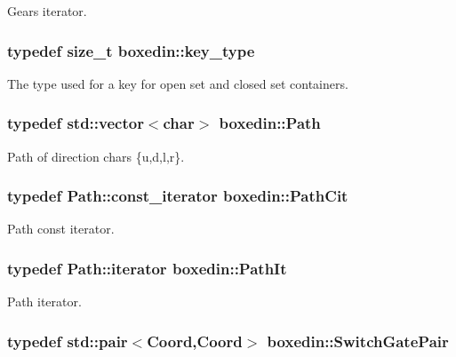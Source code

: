 Gears iterator. \hypertarget{namespaceboxedin_ac4dc3ff36b9cef0b4c5cc1a96bfc0abd}{
\subsubsection[{key\+\_\+type}]{\setlength{\rightskip}{0pt plus 5cm}typedef size\+\_\+t {\bf boxedin\+::key\+\_\+type}}}\label{namespaceboxedin_ac4dc3ff36b9cef0b4c5cc1a96bfc0abd}
The type used for a key for open set and closed set containers. \hypertarget{namespaceboxedin_ab79d3e8d943aa2875e3adb42b8917ff7}{
\subsubsection[{Path}]{\setlength{\rightskip}{0pt plus 5cm}typedef std\+::vector$<$char$>$ {\bf boxedin\+::\+Path}}}\label{namespaceboxedin_ab79d3e8d943aa2875e3adb42b8917ff7}
Path of direction chars \{u,d,l,r\}. \hypertarget{namespaceboxedin_ac425496c03d94f10ef5e861df766442a}{
\subsubsection[{Path\+Cit}]{\setlength{\rightskip}{0pt plus 5cm}typedef Path\+::const\+\_\+iterator {\bf boxedin\+::\+Path\+Cit}}}\label{namespaceboxedin_ac425496c03d94f10ef5e861df766442a}
Path const iterator. \hypertarget{namespaceboxedin_a5ada570c5ebc9f728d9b0de122316173}{
\subsubsection[{Path\+It}]{\setlength{\rightskip}{0pt plus 5cm}typedef Path\+::iterator {\bf boxedin\+::\+Path\+It}}}\label{namespaceboxedin_a5ada570c5ebc9f728d9b0de122316173}
Path iterator. \hypertarget{namespaceboxedin_ac85f00ec0a253d53da24ecfa3671f6f9}{
\subsubsection[{Switch\+Gate\+Pair}]{\setlength{\rightskip}{0pt plus 5cm}typedef std\+::pair$<${\bf Coord},{\bf Coord}$>$ {\bf boxedin\+::\+Switch\+Gate\+Pair}}}\label{namespaceboxedin_ac85f00ec0a253d53da24ecfa3671f6f9}
